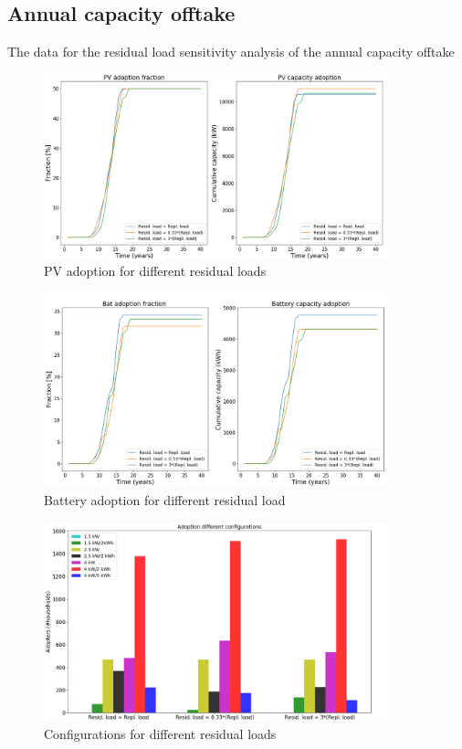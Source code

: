 \subsection{Annual capacity offtake}
The data for the residual load sensitivity analysis of the annual capacity offtake 
\newline 
\begin{figure}[h!]
    \centering
    \includegraphics[width=10cm]{AppendixA/PVCapresid.PNG}
    \caption{PV adoption for different residual loads}
    \label{fig:U}
\end{figure}
\noindent
\newline 
\begin{figure}[h!]
    \centering
    \includegraphics[width=10cm]{AppendixA/BatCapresid.PNG}
    \caption{Battery adoption for different residual load}
    \label{fig:V}
\end{figure}
\noindent
\newline 
\begin{figure}[h!]
    \centering
    \includegraphics[width=10cm]{AppendixA/ConfigCapresid.PNG}
    \caption{Configurations for different residual loads}
    \label{fig:W}
\end{figure}
